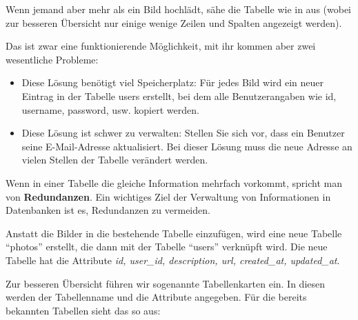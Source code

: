 Wenn jemand aber mehr als ein Bild hochlädt, sähe die Tabelle wie in  aus (wobei zur besseren Übersicht nur einige wenige Zeilen und Spalten angezeigt werden).
\begin{center}
  \begin{figure}[ht!]
  \end{figure}
  \label{fig:photoAlsSpalte}
\end{center}

Das ist zwar eine funktionierende Möglichkeit, mit ihr kommen aber zwei wesentliche Probleme:
\begin{itemize}
  \item Diese Lösung benötigt viel Speicherplatz: Für jedes Bild wird ein neuer Eintrag in der Tabelle users erstellt, bei dem alle Benutzerangaben wie id, username, password, usw. kopiert werden.
  \item Diese Lösung ist schwer zu verwalten: Stellen Sie sich vor, dass ein Benutzer seine E-Mail-Adresse aktualisiert. Bei dieser Lösung muss die neue Adresse an vielen Stellen der Tabelle verändert werden.
\end{itemize}

Wenn in einer Tabelle die gleiche Information mehrfach vorkommt, spricht man von \textbf{Redundanzen}. Ein wichtiges Ziel der Verwaltung von Informationen in Datenbanken ist es, Redundanzen zu vermeiden.

Anstatt die Bilder in die bestehende Tabelle einzufügen, wird eine neue Tabelle \enquote{photos} erstellt, die dann mit der Tabelle \enquote{users} verknüpft wird. Die neue Tabelle hat die Attribute \textit{id, user\_id, description, url, created\_at, updated\_at}.


Zur besseren Übersicht führen wir sogenannte Tabellenkarten ein. In diesen werden der Tabellenname und die Attribute angegeben. Für die bereits bekannten Tabellen sieht das so aus:

